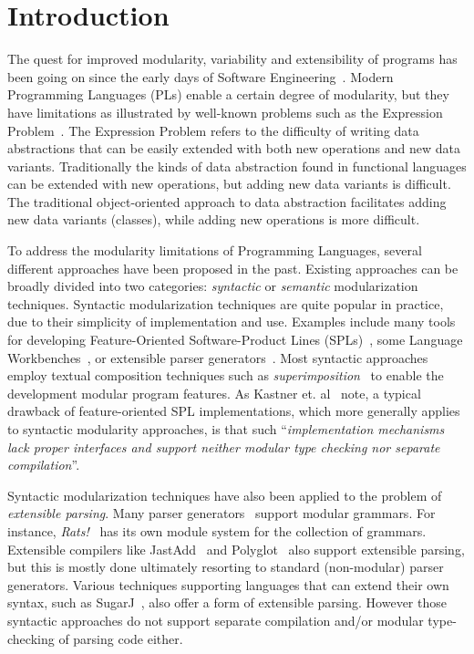 \section{Introduction}\label{sec:introduction}

The quest for improved modularity, variability and extensibility of
programs has been going on since the early days of Software
Engineering~\cite{McIlroy68}. Modern Programming Languages (PLs) enable a certain
degree of modularity, but they have limitations as illustrated by
well-known problems such as the Expression Problem~\cite{wadler1998expression}. The
Expression Problem refers to the difficulty of writing data
abstractions that can be easily extended with both new operations and
new data variants. Traditionally the kinds of data abstraction found
in functional languages can be extended with new operations, but
adding new data variants is difficult. The traditional object-oriented
approach to data abstraction facilitates adding new data variants
(classes), while adding new operations is more difficult.

To address the modularity limitations of Programming Languages, several
different approaches have been proposed in the past. Existing
approaches can be broadly divided into two categories:
\emph{syntactic} or \emph{semantic} modularization
techniques. Syntactic modularization techniques are quite popular in
practice, due to their simplicity of implementation and use.
Examples include many tools for developing Feature-Oriented Software-Product
Lines (SPLs)~\cite{AK:JOT09,Kastner11road}, some Language Workbenches~\cite{Erdweg201524}, or extensible parser
generators~\cite{antlr1995,Grimm2006,Gouseti2014,Warth2016}.  Most syntactic approaches employ textual
composition techniques such as \emph{superimposition}~\cite{AK:JOT09} to
enable the development modular program features. 
As Kastner et. al~\cite{Kastner11road} note,
a typical drawback of feature-oriented SPL implementations, which
more generally applies to syntactic modularity approaches, is that
such ``\emph{implementation mechanisms lack proper
  interfaces and support neither modular type checking nor separate
  compilation}''.

Syntactic modularization techniques have also been applied to the
problem of \emph{extensible parsing}. Many parser
generators~\cite{antlr1995,Grimm2006,Gouseti2014,Warth2016} support
modular grammars. For instance, \textit{Rats!}~\cite{Grimm2006} has
its own module system for the collection of grammars.  Extensible
compilers like JastAdd~\cite{Ekman2007} and
Polyglot~\cite{Nystrom2003} also support extensible parsing, but this
is mostly done ultimately resorting to standard (non-modular) parser
generators. Various techniques supporting languages that can extend
their own syntax, such as SugarJ~\cite{Erdweg2011}, also offer a form
of extensible parsing. However those syntactic approaches do not
support separate compilation and/or modular type-checking
of parsing code either.

